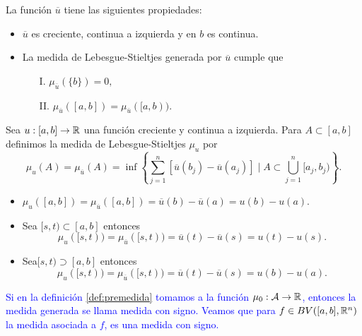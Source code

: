     
\begin{obs} La función $\overline{u}$ tiene las siguientes propiedades:
	\begin{itemize}
		\item $\overline{u}$ es creciente, continua a izquierda y en $b$ es continua.
		\item La medida de Lebesgue-Stieltjes generada por $\overline{u}$ cumple que 
		\begin{enumerate}
			\item[I.] $\mu_{\overline{u}}(\{b\})=0,$
			\item[II.] $\mu_{\overline{u}}([a,b])=\mu_{\overline{u}}([a,b)).$
		\end{enumerate}
	\end{itemize}
\end{obs}
\begin{defi}
	Sea $u:[a,b]\to\mathbb{R}$ una función  creciente y continua a izquierda. Para $A\subset[a,b]$  definimos la medida de Lebesgue-Stieltjes $\mu_u$ por 
	\begin{equation*}
	\mu_{u}(A)=\mu_{\overline{u}}(A)=\inf\left\lbrace \sum_{ j=1 }^n[\overline{u}(b_j)-\overline{u}(a_j)] \mid A\subset \bigcup_{j=1}^n[a_j,b_j)\right\rbrace. 
 \end{equation*}
\end{defi}

\begin{obs}  \vphantom{a}
	\begin{itemize}
        \item $\mu_{u}([a,b])=\mu_{\overline{u}}([a,b])=\overline{u}(b)-\overline{u}(a)=u(b)-u(a)$.
		\item Sea $[s,t)\subset[a,b]$ entonces $$\mu_{u}([s,t))=\mu_{\overline{u}}([s,t))=\overline{u}(t)-\overline{u}(s)=u(t)-u(s).$$
		
		\item Sea$[s,t)\supset[a,b]$ entonces
		$$\mu_{u}([s,t))=\mu_{\overline{u}}([s,t))=\overline{u}(t)-\overline{u}(s)=u(b)-u(a).$$
	\end{itemize}
\end{obs}







\textcolor{blue}{Si en la definición \ref{def:premedida} tomamos a la función $\mu_0:\mathcal{A}\to \mathbb{R}$, entonces la medida generada se llama medida con signo. Veamos que para $f\in BV([a,b],\mathbb{R}^n)$ la medida asociada a $f$, es una medida con signo.}



